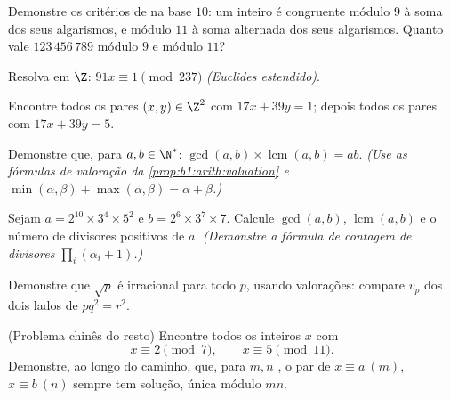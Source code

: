\begin{exercise}[$\star$]\label{exo:b1:arith:2}
Demonstre os critérios de  na base $10$: um inteiro é
congruente módulo $9$ à soma dos seus algarismos, e módulo $11$ à soma
alternada dos seus algarismos. Quanto vale $123\,456\,789$ módulo $9$ e
módulo $11$?
\end{exercise}

\begin{exercise}[$\star$]\label{exo:b1:arith:3}
Resolva em $\Z$: $91x \equiv 1 \pmod{237}$ \emph{(Euclides estendido)}.
\end{exercise}

\begin{exercise}[$\star$]\label{exo:b1:arith:4}
Encontre todos os pares $(x, y) \in \Z^2$ com $17x + 39y = 1$; depois todos os
pares com $17 x + 39 y = 5$.
\end{exercise}

\begin{exercise}[$\star\star$]\label{exo:b1:arith:5}
Demonstre que, para $a, b \in \N^*$: $\gcd(a,b) \times
\operatorname{lcm}(a,b) = ab$. \emph{(Use as fórmulas de valoração da
\cref{prop:b1:arith:valuation} e $\min(\alpha,\beta) +
\max(\alpha,\beta) = \alpha + \beta$.)}
\end{exercise}

\begin{exercise}[$\star\star$]\label{exo:b1:arith:6}
Sejam $a = 2^{10} \times 3^4 \times 5^2$ e $b = 2^6 \times 3^7 \times
7$. Calcule $\gcd(a, b)$, $\operatorname{lcm}(a,b)$ e o número de
divisores positivos de $a$. \emph{(Demonstre a fórmula de contagem de
divisores $\prod_i (\alpha_i + 1)$.)}
\end{exercise}

\begin{exercise}[$\star\star$]\label{exo:b1:arith:7}
Demonstre que $\sqrt p$ é irracional para todo  $p$, usando
valorações: compare $v_p$ dos dois lados de $p q^2 = r^2$.
\end{exercise}

\begin{exercise}[$\star\star$]\label{exo:b1:arith:8}
(Problema chinês do resto) Encontre todos os inteiros $x$ com
\[
x \equiv 2 \pmod 7, \qquad x \equiv 5 \pmod{11}.
\]
Demonstre, ao longo do caminho, que, para $m, n$ , o par
de  $x \equiv a \ (m)$, $x \equiv b\ (n)$ sempre tem solução, única
módulo $mn$.
\end{exercise}

